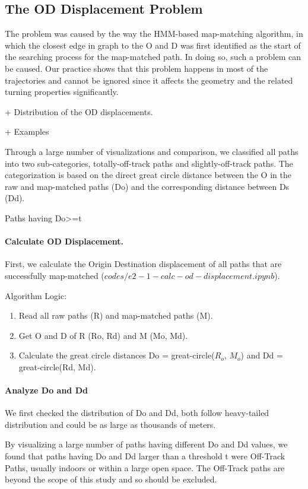 \documentclass{article}
\begin{document}
\subsection{The OD Displacement Problem}

The problem was caused by the way the HMM-based map-matching algorithm, in which the closest edge in graph to the O and D was first identified as the start of the searching process for the map-matched path. In doing so, such a problem can be caused. Our practice shows that this problem happens in most of the trajectories and cannot be ignored since it affects the geometry and the related turning properties significantly.
            
+ Distribution of the OD displacements.

+ Examples 

Through a large number of visualizations and comparison, we classified all paths into two sub-categories, totally-off-track paths and slightly-off-track paths. The categorization is based on the direct great circle distance between the O in the raw and map-matched paths (Do) and the corresponding distance between Ds (Dd).

Paths having Do>=t 

\paragraph{Calculate OD Displacement.} First, we calculate the Origin Destination displacement of all paths that are successfully map-matched ($codes/e2-1-calc-od-displacement.ipynb$).  

Algorithm Logic:
\begin{enumerate}
  \item Read all raw paths (R) and map-matched paths (M).
  \item Get O and D of R (Ro, Rd) and M (Mo, Md).
  \item Calculate the great circle distances Do = great-circle($R_o$, $M_o$) and Dd = great-circle(Rd, Md).
\end{enumerate}

\paragraph{Analyze Do and Dd} We first checked the distribution of Do and Dd, both follow heavy-tailed distribution and could be as large as thousands of meters.  

By visualizing a large number of paths having different Do and Dd values, we found that paths having Do and Dd larger than a threshold t were Off-Track Paths, usually indoors or within a large open space. The Off-Track paths are beyond the scope of this study and so should be excluded. 
\end{document}

